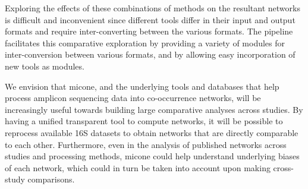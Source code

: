 
Exploring the effects of these combinations of methods on the resultant networks is difficult and inconvenient since different tools differ in their input and output formats and require inter-converting between the various formats.
The pipeline facilitates this comparative exploration by providing a variety of modules for inter-conversion between various formats, and by allowing easy incorporation of new tools as modules.

We envision that \ac{micone}, and the underlying tools and databases that help process amplicon sequencing data into co-occurrence networks, will be increasingly useful towards building large comparative analyses across studies. By having a unified transparent tool to compute networks, it will be possible to reprocess available 16S datasets to obtain networks that are directly comparable to each other.
Furthermore, even in the analysis of published networks across studies and processing methods, \ac{micone} could help understand underlying biases of each network, which could in turn be taken into account upon making cross-study comparisons.  

